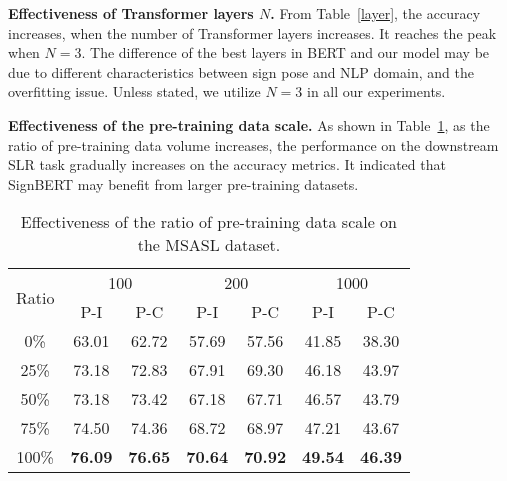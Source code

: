\documentclass[10pt,twocolumn,letterpaper]{article}
\begin{document}
\noindent \textbf{Effectiveness of Transformer layers $N$.}
From Table~\ref{layer}, the accuracy increases, when the number of Transformer layers increases.
It reaches the peak when $N=3$.
The difference of the best layers in BERT and our model may be due to different characteristics between sign pose and NLP domain, and the overfitting issue.
Unless stated, we utilize $N=3$ in all our experiments.


\noindent \textbf{Effectiveness of the pre-training data scale.}
As shown in Table~\ref{data-scale}, as the ratio of pre-training data volume increases, the performance on the downstream SLR task gradually increases on the accuracy metrics.
It indicated that SignBERT may benefit from larger pre-training datasets.


\begin{table}[t]
\small
\tabcolsep=5pt
\begin{center}
\begin{tabular}{c|cc|cc|cc}
\hline
\multicolumn{1}{c|}{\multirow{2}{*}{Ratio}} & \multicolumn{2}{c|}{100} & \multicolumn{2}{c|}{200} & \multicolumn{2}{c}{1000} \\
           & P-I & P-C & P-I   & P-C   & P-I   & P-C   \\ \hline \hline
0\%  & 63.01 & 62.72 & 57.69 & 57.56 & 41.85 & 38.30  \\
25\% & 73.18 & 72.83 & 67.91 & 69.30 & 46.18 & 43.97  \\
50\% & 73.18 & 73.42 & 67.18 & 67.71 & 46.57 & 43.79  \\
75\% & 74.50 & 74.36 & 68.72 & 68.97 & 47.21 & 43.67  \\
100\% & \textbf{76.09} & \textbf{76.65} & \textbf{70.64} & \textbf{70.92} & \textbf{49.54} & \textbf{46.39} \\ \hline   
\end{tabular}
\end{center}
\caption{Effectiveness of the ratio of pre-training data scale on the MSASL dataset.}
\label{data-scale}
\vspace{-0.2cm}
\end{table}
\end{document}
